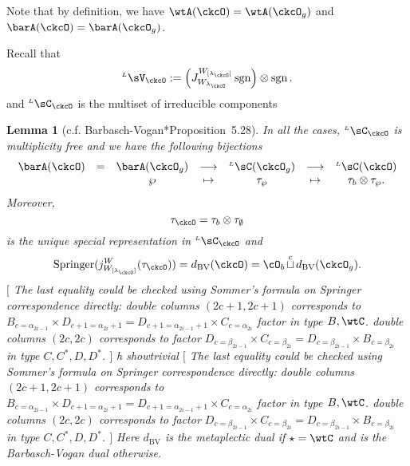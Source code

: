 \documentclass[12pt,a4paper]{amsart}
\newcommand{\trivial}[2][]{\if\relax\detokenize{#1}\relax
  {%
      \color{orange} \vspace{0em} $[$  #2 $]$
      \color{black}
  }
  \else
\ifx#1h
\ifcsname showtrivial\endcsname
{%
    \color{orange} \vspace{0em}  $[$ #2 $]$
    \color{black}
}
\fi
\else {\red Wrong argument!} \fi
\fi
}
\newcommand{\sgn}{\operatorname{sgn}}
\numberwithin{equation}{section}
\newtheorem{lem}[thm]{Lemma}
\theoremstyle{remark}
\def\dBV{d_{\mathrm{BV}}}
\def\lamck{\lambda_\ckcO}
\def\WLamck{W_{[\lambda_{\ckcO}]}}
\def\Wlamck{W_{\lamck}}
\def\LV{{}^{\scriptscriptstyle L}\sV}
\def\LC{{}^{\scriptscriptstyle L}\sC}
\def\LV{{}^{\scriptscriptstyle L}\sV}
\def\cupcol{{\stackrel{c}{\sqcup}}}
\def\Spr{\mathrm{Springer}}
\def\cupcol{{\,\stackrel{c}{\sqcup}\,}}
\begin{document}
  Note that by definition, we have $\wtA(\ckcO)=\wtA(\ckcO_{g})$ and
  $\barA(\ckcO)=\barA(\ckcO_{g})$.

  Recall that
  \[
    \LV_{\ckcO}:= \left(J_{\Wlamck}^{\WLamck} \sgn\right) \otimes \sgn.
  \]
  and $\LC_{\ckcO}$ is the multiset of irreducible components

  \begin{lem}[c.f. Barbasch-Vogan{\cite{BVUni}*{Proposition~5.28}}]
    \label{lem:Lcell}
    In all the cases, $\LC_{\ckcO}$ is multiplicity free and we have the
    following bijections
    \[
      \begin{array}{lccccccc}
        \barA(\ckcO)&=&\barA(\ckcO_{g}) & \longrightarrow & \LC(\ckcO_{g})
        & \longrightarrow & \LC(\ckcO)\\
                    &  &\wp & \mapsto & \tau_{\wp} &
                                                     \mapsto & \tau_{b}\otimes \tau_{\wp}.
      \end{array}
    \]
    Moreover,
    \[
      \tau_{\ckcO}=\tau_{b}\otimes \tau_{\emptyset}
    \] is the unique special representation in $\LC_{\ckcO}$ and
    \begin{equation}\label{eq:dBV.W}
      \Spr(j_{\WLamck}^{W}(\tau_{\ckcO})) = \dBV(\ckcO) = \cO_{b}\cupcol \dBV(\ckcO_{g}).
    \end{equation}
    \trivial[]{ The last equality could be checked using Sommer's formula on
      Springer correspondence directly: double columns $(2c+1,2c+1)$ corresponds
      to
      $ B_{c=\alpha_{2i-1}}\times D_{c+1=\alpha_{2i}+1}=D_{c+1=\alpha_{2i-1}+1}\times C_{c=\alpha_{2i}}$
      factor in type $B,\wtC$. double columns $(2c,2c)$ corresponds to factor
      $D_{c=\beta_{2i-1}}\times C_{c=\beta_{2i}}=D_{c=\beta_{2i-1}}\times B_{c=\beta_{2i}}$
      in type $C,C^{*},D,D^{*}$. } Here $\dBV$ is the metaplectic dual if
    $\star=\wtC$ and is the Barbasch-Vogan dual otherwise.
  \end{lem}
\end{document}
